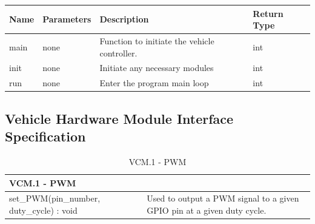 \documentclass [10pt]{article}
\begin{document}
\begin{longtable}{ p{ }  p{ } p{} p{}} \\ 

\rowcolor{tableCell} \textbf{Name} & \textbf{Parameters} & \textbf{Description} &\textbf{Return Type} \\ \hline
\rowcolor{tableCell} main & none & Function to initiate the vehicle controller.
 & int \\ \hline
\rowcolor{tableCell} init & none & Initiate any necessary modules &  int \\ \hline
\rowcolor{tableCell} run & none & Enter the program main loop &  int \\ \hline

\end{longtable}


















\subsection{Vehicle Hardware Module Interface Specification}
\newcommand{\VCMPWMsig}{set\_PWM(pin\_number, duty\_cycle) : void}
\newcommand{\VCMPWMdesc}{Used to output a PWM signal to a given GPIO pin at a given duty cycle.}

\newcommand{\VCMSPEEDsig}{get\_speed( ) : double}
\newcommand{\VCMSPEEDdesc}{Returns the current speed of the vehicle as measured by the Hall Effect sensor.}

\newcommand{\VCMSERVOsig}{set\_angle( angle : double ) : void}
\newcommand{\VCMSERVOdesc}{Outputs a physical signal to the servo to go to the specified angle.}

\newcommand{\VCMMOTORsig}{set\_speed( speed : double ) : void}
\newcommand{\VCMMOTORdesc}{Outputs a physical signal to the motor to go at a specified speed.}

\begin{longtable}{| p{ } | p{ } | }\caption{VCM.1 - PWM} \\\hline  
\multicolumn{2}{|l|}{\textbf {VCM.1 - PWM}}\\ \hline
 \rowcolor{tableCell}  \VCMPWMsig & \VCMPWMdesc \\\hline
\end{longtable}
\end{document}
